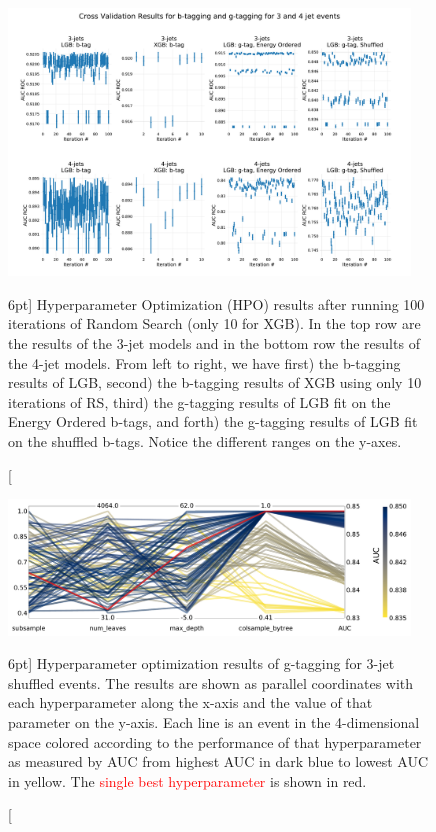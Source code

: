 \documentclass[a4paper, twoside, nobib]{tufte-book}
\begin{document}
\begin{figure}
  \includegraphics[width=0.95\textwidth, trim=10 10 10 60, clip]{figures/quarks/cv_res_lgb-down_sample=1.00-ML_vars=vertex-selection=b-ejet_min=4-n_iter_RS_lgb=99-n_iter_RS_xgb=9-cdot_cut=0.90-version=19.pdf}
  \caption[Hyperparameter Optimization of b- and g-tagging][6pt]
          {Hyperparameter Optimization (HPO) results after running 100 iterations of Random Search (only 10 for XGB). In the top row are the results of the 3-jet models and in the bottom row the results of the 4-jet models. From left to right, we have first) the b-tagging results of LGB, second) the b-tagging results of XGB using only 10 iterations of RS, third) the g-tagging results of LGB fit on the Energy Ordered b-tags, and forth) the g-tagging results of LGB fit on the shuffled b-tags. Notice the different ranges on the y-axes.
          } 
  \label{fig:q:CV_res_iterations}
\end{figure}


\begin{figure}
  \includegraphics[width=0.95\textwidth, trim=0 0 0 0, clip]{figures/quarks/CV_viz-njet=3-name=lf_gtag_shuffled_lgb_down_sample=1.00-ML_vars=vertex-selection=b-ejet_min=4-n_iter_RS_lgb=99-n_iter_RS_xgb=9-cdot_cut=0.90-version=19.pdf}
  \caption[Overview of Hyperparamaters of g-tagging for 3-jet shuffled events][6pt]
          {Hyperparameter optimization results of g-tagging for 3-jet shuffled events. The results are shown as parallel coordinates with each hyperparameter along the x-axis and the value of that parameter on the y-axis. Each line is an event in the 4-dimensional space colored according to the performance of that hyperparameter as measured by AUC from \textcolor{viridis-dark}{highest} AUC in dark blue to \textcolor{viridis-light}{lowest} AUC in yellow. The \textcolor{red}{single best hyperparameter} is shown in red. 
          } 
  \label{fig:q:CV_res_parallel_coords}
\end{figure}
\end{document}

